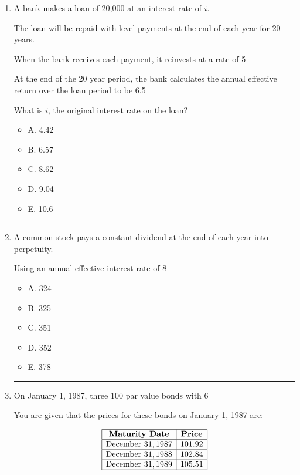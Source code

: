 \documentclass[11pt]{article}
\begin{document}
\begin{enumerate}[label=\textbf{\arabic*.}]
\medskip
\hrule
\medskip

\item A bank makes a loan of 20,000 at an interest rate of $i$.

The loan will be repaid with level payments at the end of each year for 20 years.

When the bank receives each payment, it reinvests at a rate of 5%

At the end of the 20 year period, the bank calculates the annual effective return over the loan period to be 6.5%

What is $i$, the original interest rate on the loan?

\begin{itemize}
\item A. 4.42%
\item B. 6.57%
\item C. 8.62%
\item D. 9.04%
\item E. 10.6%
\end{itemize}

\medskip
\hrule
\medskip

\item A common stock pays a constant dividend at the end of each year into perpetuity.

Using an annual effective interest rate of 8%

\begin{itemize}
\item A. 324
\item B. 325
\item C. 351
\item D. 352
\item E. 378
\end{itemize}

\medskip
\hrule
\medskip

\item On January 1, 1987, three 100 par value bonds with 6%

You are given that the prices for these bonds on January 1, 1987 are:

\[
\begin{array}{|c|c|}
\hline
\textbf{Maturity Date} & \textbf{Price} \\
\hline
\text{December } 31, 1987 & 101.92 \\
\hline
\text{December } 31, 1988 & 102.84 \\
\hline
\text{December } 31, 1989 & 105.51 \\
\hline
\end{array}
\]


\end{enumerate}
\end{document}
